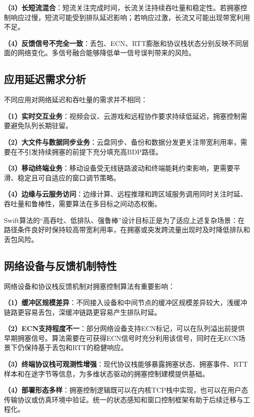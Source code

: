 \textbf{（3）长短流混合}：短流关注完成时间，长流关注持续吞吐量和稳定性。若拥塞控制响应过慢，短流可能受到排队延迟影响；若响应过激，长流又可能出现带宽利用不足。

\textbf{（4）反馈信号不完全一致}：丢包、ECN、RTT膨胀和协议栈状态分别反映不同层面的网络变化。多信号融合能够降低单一信号误判带来的风险。

\subsection{应用延迟需求分析}

不同应用对网络延迟和吞吐量的需求并不相同：

\textbf{（1）实时交互业务}：视频会议、云游戏和远程协作要求持续低延迟，拥塞控制需要避免队列长期驻留。

\textbf{（2）大文件与数据同步业务}：云盘同步、备份和数据分发更关注带宽利用率，需要在不引发持续拥塞的前提下充分填充高BDP路径。

\textbf{（3）移动终端业务}：移动设备受无线链路波动和终端能耗约束影响，更需要平滑、稳定且可自适应的窗口调节策略。

\textbf{（4）边缘与云服务访问}：边缘计算、远程推理和跨区域服务调用同时关注时延、吞吐量和鲁棒性，需要算法在多目标之间动态权衡。

Swift算法的“高吞吐、低排队、强鲁棒”设计目标正是为了适应上述复杂场景：在路径条件良好时保持较高带宽利用率，在拥塞或突发跨流量出现时及时降低排队和丢包风险。

\subsection{网络设备与反馈机制特性}

网络设备和协议栈反馈机制对拥塞控制算法有重要影响：

\textbf{（1）缓冲区规模差异}：不同接入设备和中间节点的缓冲区规模差异较大，浅缓冲链路更容易丢包，深缓冲链路更容易产生排队时延。

\textbf{（2）ECN支持程度不一}：部分网络设备支持ECN标记，可以在队列溢出前提供早期拥塞信号。算法需要在可获得ECN信号时充分利用该信号，同时在无ECN场景下仍保持基于丢包和RTT的稳健响应。

\textbf{（3）终端协议栈可观测性增强}：现代协议栈能够暴露拥塞状态、拥塞事件、RTT样本和在途字节等信息，为多维状态驱动的拥塞控制建模提供基础。

\textbf{（4）部署形态多样}：拥塞控制逻辑既可以在内核TCP栈中实现，也可以在用户态传输协议或仿真环境中验证。统一的状态感知和窗口控制框架有助于后续迁移与工程化。

